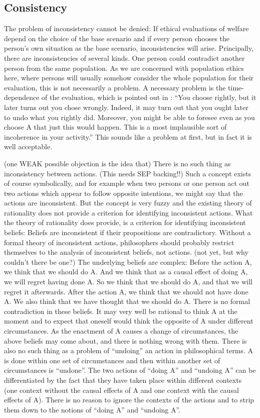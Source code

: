 \subsection{Consistency}
The problem of inconsistency cannot be denied: If ethical evaluations of welfare depend on the choice of the base scenario and if every person chooses the person’s own situation as the base scenario, inconsistencies will arise. Principally, there are inconsistencies of several kinds. One person could contradict another person from the same population. As we are concerned with population ethics here, where persons will usually somehow consider the whole population for their evaluation, this is not necessarily a problem. A necessary problem is the time-dependence of the evaluation, which is pointed out in : “You choose rightly, but it later turns out you chose wrongly. Indeed, it may turn out that you ought later to undo what you rightly did. Moreover, you might be able to foresee even as you choose A that just this would happen. This is a most implausible sort of incoherence in your activity.” This sounds like a problem at first, but in fact it is well acceptable.  

(one WEAK possible objection is the idea that) There is no such thing as inconsistency between actions. (This needs SEP backing!!) Such a concept exists of course symbolically, and for example when two persons or one person act out two actions which appear to follow opposite intentions, we might say that the actions are inconsistent. But the concept is very fuzzy and the existing theory of rationality does not provide a criterion for identifying inconsistent actions. What the theory of rationality does provide, is a criterion for identifying inconsistent beliefs: Beliefs are inconsistent if their propositions are contradictory. Without a formal theory of inconsistent actions, philosophers should probably restrict themselves to the analysis of inconsistent beliefs, not actions. (not yet, but why couldn’t there be one?) The underlying beliefs are complex: Before the action A, we think that we should do A. And we think that as a causal effect of doing A, we will regret having done A. So we think that we should do A, and that we will regret it afterwards. After the action A, we think that we should not have done A. We also think that we have thought that we should do A. There is no formal contradiction in these beliefs. It may very well be rational to think A at the moment and to expect that oneself would think the opposite of A under different circumstances. As the enactment of A causes a change of circumstances, the above beliefs may come about, and there is nothing wrong with them. There is also no such thing as a problem of “undoing” an action in philosophical terms. A is done within one set of circumstances and then within another set of circumstances is “undone”. The two actions of “doing A” and “undoing A” can be differentiated by the fact that they have taken place within different contexts (one context without the causal effects of A and one context with the causal effects of A). There is no reason to ignore the contexts of the actions and to strip them down to the notions of “doing A” and “undoing A”.  

